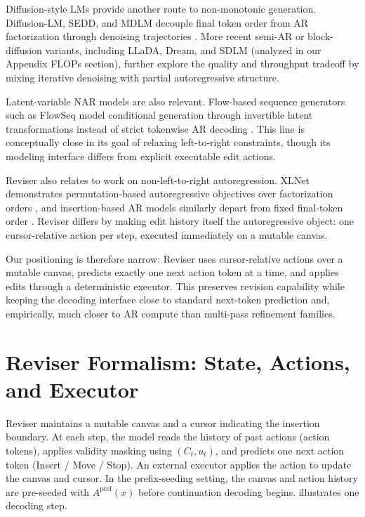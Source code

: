 \documentclass[11pt]{article}
\DeclareRobustCommand{\ph}[1]{#1}
\DeclareRobustCommand{\phA}{A}
\DeclareRobustCommand{\ph}[1]{\ifmmode\text{\phoenicianfont #1}\else{\phoenicianfont #1}\fi}
\DeclareRobustCommand{\phA}{\ph{\char"10900}} %
\DeclareRobustCommand{\ph}[1]{#1}
\DeclareRobustCommand{\phA}{A}
\begin{document}
Diffusion-style LMs provide another route to non-monotonic generation. Diffusion-LM, SEDD, and MDLM decouple final token order from AR factorization through denoising trajectories \citep{li2022diffusionlm,lou2024sedd,sahoo2024mdlm}. More recent semi-AR or block-diffusion variants, including LLaDA, Dream, and SDLM (analyzed in our Appendix FLOPs section), further explore the quality and throughput tradeoff by mixing iterative denoising with partial autoregressive structure.

Latent-variable NAR models are also relevant. Flow-based sequence generators such as FlowSeq model conditional generation through invertible latent transformations instead of strict tokenwise AR decoding \citep{ma2019flowseq}. This line is conceptually close in its goal of relaxing left-to-right constraints, though its modeling interface differs from explicit executable edit actions.

Reviser also relates to work on non-left-to-right autoregression. XLNet demonstrates permutation-based autoregressive objectives over factorization orders \citep{yang2019xlnet}, and insertion-based AR models similarly depart from fixed final-token order \citep{stern2019insertion}. Reviser differs by making edit history itself the autoregressive object: one cursor-relative action per step, executed immediately on a mutable canvas.

Our positioning is therefore narrow: Reviser uses cursor-relative actions over a mutable canvas, predicts exactly one next action token at a time, and applies edits through a deterministic executor. This preserves revision capability while keeping the decoding interface close to standard next-token prediction and, empirically, much closer to AR compute than multi-pass refinement families.

\section{Reviser Formalism: State, Actions, and Executor}
\label{sec:overview}

Reviser maintains a mutable canvas and a cursor indicating the insertion boundary. At each step, the model reads the history of past actions (action tokens), applies validity masking using $(C_t,u_t)$, and predicts one next action token (Insert / Move / Stop). An external executor applies the action to update the canvas and cursor. In the prefix-seeding setting, the canvas and action history are pre-seeded with $\phA^{\text{pref}}(x)$ before continuation decoding begins.  illustrates one decoding step.
\end{document}
